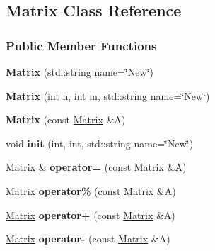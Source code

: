 \hypertarget{classMatrix}{}\subsection{Matrix Class Reference}
\label{classMatrix}
\subsubsection*{Public Member Functions}
\begin{DoxyCompactItemize}
\item 
\mbox{\label{classMatrix_aca9d2af58b3c9a5c2576512941a58c5b}} 
{\bfseries Matrix} (std\+::string name=\char`\"{}New\char`\"{})
\item 
\mbox{\label{classMatrix_afd59ecd3d47891114d99f21351fcc665}} 
{\bfseries Matrix} (int n, int m, std\+::string name=\char`\"{}New\char`\"{})
\item 
\mbox{\label{classMatrix_aaceda49b8ba637f622d4ec3b427ff045}} 
{\bfseries Matrix} (const \hyperlink{classMatrix}{Matrix} \&A)
\item 
\mbox{\label{classMatrix_ae4726533935968ad55e45f7c39c79d19}} 
void {\bfseries init} (int, int, std\+::string name=\char`\"{}New\char`\"{})
\item 
\mbox{\label{classMatrix_a985b8ff0bd1f3bbd19cfa5fe9b9b9f31}} 
\hyperlink{classMatrix}{Matrix} \& {\bfseries operator=} (const \hyperlink{classMatrix}{Matrix} \&A)
\item 
\mbox{\label{classMatrix_ad154bc94a144a368cbcb7bd40e51feaa}} 
\hyperlink{classMatrix}{Matrix} {\bfseries operator\%} (const \hyperlink{classMatrix}{Matrix} \&A)
\item 
\mbox{\label{classMatrix_a60a307403e3482007487dfd60c8461b8}} 
\hyperlink{classMatrix}{Matrix} {\bfseries operator+} (const \hyperlink{classMatrix}{Matrix} \&A)
\item 
\mbox{\label{classMatrix_a528d48ea764ca99d8e0d4df6e86804dd}} 
\hyperlink{classMatrix}{Matrix} {\bfseries operator-\/} (const \hyperlink{classMatrix}{Matrix} \&A)
\item 

\end{DoxyCompactItemize}
